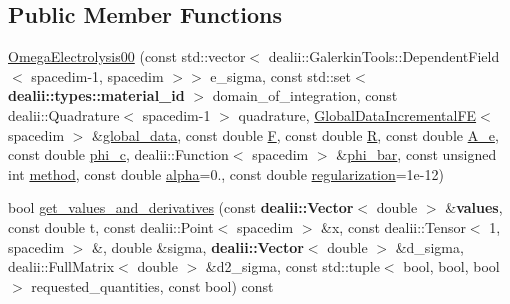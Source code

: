 \subsection*{Public Member Functions}
\begin{DoxyCompactItemize}
\item 
\hyperlink{classincremental_f_e_1_1_omega_electrolysis00_aeead020666687a08d0dd021ad771c83a}{Omega\+Electrolysis00} (const std\+::vector$<$ dealii\+::\+Galerkin\+Tools\+::\+Dependent\+Field$<$ spacedim-\/1, spacedim $>$$>$ e\+\_\+sigma, const std\+::set$<$ {\bf dealii\+::types\+::material\+\_\+id} $>$ domain\+\_\+of\+\_\+integration, const dealii\+::\+Quadrature$<$ spacedim-\/1 $>$ quadrature, \hyperlink{classincremental_f_e_1_1_global_data_incremental_f_e}{Global\+Data\+Incremental\+FE}$<$ spacedim $>$ \&\hyperlink{classincremental_f_e_1_1_omega_abd23d288a7a4a43f9b528be968cd2113}{global\+\_\+data}, const double \hyperlink{classincremental_f_e_1_1_omega_electrolysis00_ae7bb59bca61e20800d8f26b18ea91f87}{F}, const double \hyperlink{classincremental_f_e_1_1_omega_electrolysis00_a1961fc52f44812e204ed81278a1bfa91}{R}, const double \hyperlink{classincremental_f_e_1_1_omega_electrolysis00_af015904f2eb09848ed82ca739410096e}{A\+\_\+e}, const double \hyperlink{classincremental_f_e_1_1_omega_electrolysis00_ab69759b01a0d2e728c35fb94c9570f6e}{phi\+\_\+c}, dealii\+::\+Function$<$ spacedim $>$ \&\hyperlink{classincremental_f_e_1_1_omega_electrolysis00_ac489e8ba97912c01587b14b945cbf0b7}{phi\+\_\+bar}, const unsigned int \hyperlink{classincremental_f_e_1_1_omega_a7600d263ebf98129629e44fa67e8a58c}{method}, const double \hyperlink{classincremental_f_e_1_1_omega_a891688560ec0ad8dc5a0058a7b400269}{alpha}=0., const double \hyperlink{classincremental_f_e_1_1_omega_electrolysis00_a950a1633952a7a5a7cd69f590aa90528}{regularization}=1e-\/12)
\item 
bool \hyperlink{classincremental_f_e_1_1_omega_electrolysis00_ac2bf76c266936461a5b8cfb7a60624da}{get\+\_\+values\+\_\+and\+\_\+derivatives} (const {\bf dealii\+::\+Vector}$<$ double $>$ \&{\bf values}, const double t, const dealii\+::\+Point$<$ spacedim $>$ \&x, const dealii\+::\+Tensor$<$ 1, spacedim $>$ \&, double \&sigma, {\bf dealii\+::\+Vector}$<$ double $>$ \&d\+\_\+sigma, dealii\+::\+Full\+Matrix$<$ double $>$ \&d2\+\_\+sigma, const std\+::tuple$<$ bool, bool, bool $>$ requested\+\_\+quantities, const bool) const 
\end{DoxyCompactItemize}
